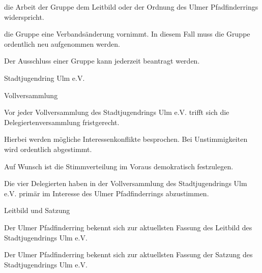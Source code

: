 \begin{legal}
\begin{legal}
\begin{legal}
\begin{legal}
                            \item die Arbeit der Gruppe dem Leitbild oder der Ordnung des Ulmer 
                                  Pfadfinderrings widerspricht.
                            \item die Gruppe eine Verbandsänderung vornimmt. In diesem Fall muss 
                                  die Gruppe ordentlich neu aufgenommen werden.
                        \end{legal}
                    \item Der Ausschluss einer Gruppe kann jederzeit beantragt werden.
                \end{legal}
        \end{legal}
    \item Stadtjugendring Ulm e.V.
        \begin{legal}
            \item Vollversammlung
                \begin{legal}
                    \item Vor jeder Vollversammlung des Stadtjugendrings Ulm e.V. trifft sich die 
                          Delegiertenversammlung fristgerecht.
                    \item Hierbei werden mögliche Interessenkonflikte besprochen.
                          Bei Unstimmigkeiten wird ordentlich abgestimmt.
                    \item Auf Wunsch ist die Stimmverteilung im Voraus demokratisch festzulegen.
                    \item Die vier Delegierten haben in der Vollversammlung des 
                          Stadtjugendrings Ulm e.V. primär im Interesse des Ulmer Pfadfinderrings 
                          abzustimmen.
                \end{legal}
            \item Leitbild und Satzung
                \begin{legal}
                    \item Der Ulmer Pfadfinderring bekennt sich zur aktuellsten Fassung 
                          des Leitbild des Stadtjugendrings Ulm e.V.
                    \item Der Ulmer Pfadfinderring bekennt sich zur aktuellsten Fassung der 
                          Satzung des Stadtjugendrings Ulm e.V.
                \end{legal}
        \end{legal}

\end{legal}
